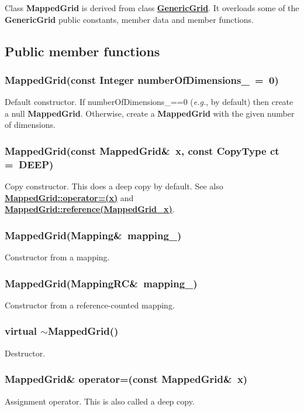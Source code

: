 \documentclass{article}
\begin{document}
Class \textbf{MappedGrid} is derived from class
{\bf{}\hyperref{GenericGrid}{GenericGrid \rm(\S}{)}{GenericGrid}}.
It overloads some of the \textbf{GenericGrid} public constants,
member data and member functions.

\subsection{Public member functions}
\label{MappedGrid::PublicMemberFunctions}

  \subsubsection{MappedGrid(const Integer numberOfDimensions\_~=~0)}
  \label{MappedGrid::MappedGrid(numberOfDimensions_)}
    Default constructor.
    If numberOfDimensions\_==0 ({\sl{}e.g.}, by default) then create a null \textbf{MappedGrid}.
    Otherwise, create a \textbf{MappedGrid} with the given number of dimensions.
  \subsubsection{MappedGrid(const MappedGrid\&~x, const CopyType ct =~DEEP)}
  \label{MappedGrid::MappedGrid(x,ct)}
    Copy constructor.  This does a deep copy by default.
    See also {\bf{}\hyperref{operator=(x)}{operator=(x) \rm(\S}{)}{MappedGrid::operator=(x)}}
    and {\bf{}\hyperref{reference(const MappedGrid\& x)}{reference(const MappedGrid\& x) \rm(\S}{)}{MappedGrid::reference(MappedGrid_x)}}.

  \subsubsection{MappedGrid(Mapping\&~mapping\_)}
  \label{MappedGrid::MappedGrid(Mapping_mapping_)}
    Constructor from a mapping.
  \subsubsection{MappedGrid(MappingRC\&~mapping\_)}
  \label{MappedGrid::MappedGrid(MappingRC_mapping_)}
    Constructor from a reference-counted mapping.
  \subsubsection{virtual $\sim$MappedGrid()}
  \label{MappedGrid::tilde_MappedGrid()}
    Destructor.
  \subsubsection{MappedGrid\& operator=(const MappedGrid\&~x)}
  \label{MappedGrid::operator=(x)}
    Assignment operator.  This is also called a deep copy.
\end{document}
